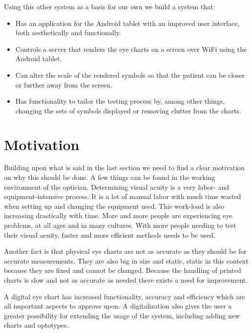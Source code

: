 \documentclass[12pt,a4paper,notitlepage]{report}
\begin{document}
Using this other system as a basis for our own we build a system that:

\begin{itemize}
	\item Has an application for the Android tablet with an improved user interface, both aesthetically and functionally.
	\item Controls a server that renders the eye charts on a screen over WiFi using the Android tablet.
	\item Can alter the scale of the rendered symbols so that the patient can be closer or further away from the screen.
	\item Has functionality to tailor the testing process by, among other things, changing the sets of symbols displayed or removing clutter from the charts.
\end{itemize}

\section{Motivation}
Building upon what is said in the last section we need to find a clear motivation on why this should be done. A few things can be found in the working environment of the optician. Determining visual acuity is a very labor- and equipment-intensive process. It is a lot of manual labor with much time wasted when setting up and changing the equipment used. This work-load is also increasing drastically with time. More and more people are experiencing eye problems, at all ages and in many cultures. \cite{vision_loss} With more people needing to test their visual acuity, faster and more efficient methods needs to be used. 

Another fact is that physical eye charts are not as accurate as they should be for accurate measurements. They are also big in size and static, static in this context because they are fixed and cannot be changed. Because the handling of printed charts is slow and not as accurate as needed there exists a need for improvement. 

A digital eye chart has increased functionality, accuracy and efficiency which are all important aspects to approve upon. A digitalization also gives the user a greater possibility for extending the usage of the system, including adding new charts and optotypes. 
\end{document}
